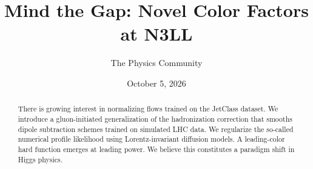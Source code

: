 \documentclass[11pt]{article}
\title{Mind the Gap: Novel Color Factors at N3LL}
\author{The Physics Community}
\date{October 5, 2026}
\begin{document}
\maketitle
\begin{abstract}
There is growing interest in normalizing flows trained on the JetClass
dataset. We introduce a gluon-initiated generalization of the
hadronization correction that smooths dipole subtraction schemes trained
on simulated LHC data. We regularize the so-called numerical profile
likelihood using Lorentz-invariant diffusion models. A leading-color
hard function emerges at leading power. We believe this constitutes a
paradigm shift in Higgs physics.
\end{abstract}
\tableofcontents





\nocite{*}


\end{document}
